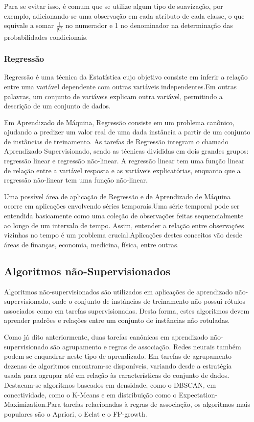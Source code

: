 \documentclass{article}
\begin{document}
Para se evitar isso, é comum que se utilize algum tipo de suavização, por exemplo, adicionando-se uma observação em cada atributo de cada classe, o que equivale a somar $\frac{1}{|C|}$ no numerador e 1 no denominador na determinação das probabilidades condicionais.

\subsubsection{Regressão}

Regressão é uma técnica da Estatística cujo objetivo consiste em inferir a relação entre uma variável dependente com outras variáveis independentes.Em outras palavras, um conjunto de variáveis explicam outra variável, permitindo a descrição de um conjunto de dados.

Em Aprendizado de Máquina, Regressão consiste em um problema canônico, ajudando a predizer um valor real de uma dada instância a partir de um conjunto de instâncias de treinamento. As tarefas de Regressão integram o chamado Aprendizado Supervisionado, sendo as técnicas divididas em dois grandes grupos: regressão linear e regressão não-linear. A regressão linear tem uma função linear de relação entre a variável resposta e as variáveis explicatórias, enquanto que a regressão não-linear tem uma função não-linear.

Uma possível área de aplicação de Regressão e de Aprendizado de Máquina ocorre em aplicações envolvendo séries temporais.Uma série temporal pode ser entendida basicamente como uma coleção de observações feitas sequencialmente ao longo de um intervalo de tempo. Assim, entender a relação entre observações vizinhas no tempo é um problema crucial.Aplicações destes conceitos vão desde áreas de finanças, economia, medicina, física, entre outras.

\subsection{Algoritmos não-Supervisionados}

Algoritmos não-supervisionados são utilizados em aplicações de aprendizado não-supervisionado, onde o conjunto de instâncias de treinamento não possui rótulos associados como em tarefas supervisionadas. Desta forma, estes algoritmos devem aprender padrões e relações entre um conjunto de instâncias não rotuladas.

Como já dito anteriormente, duas tarefas canônicas em aprendizado não-supervisionado são agrupamento e regras de associação. Redes neurais também podem se enquadrar neste tipo de aprendizado. Em tarefas de agrupamento dezenas de algoritmos encontram-se disponíveis, variando desde a estratégia usada para agrupar até em relação às características do conjunto de dados. Destacam-se algoritmos baseados em densidade, como o DBSCAN, em conectividade, como o K-Means e em distribuição como o Expectation-Maximization.Para tarefas relacionadas à regras de associação, os algoritmos mais populares são o Apriori, o Eclat e o FP-growth.  
\end{document}
